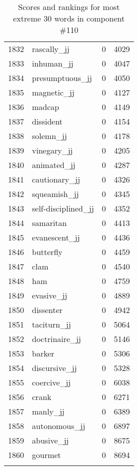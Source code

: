 \begin{longtable}[!htbp]{| rlr@{.}l |}
    1832 & rascally\_jj & 0 & 4029 \\
    1833 & inhuman\_jj & 0 & 4047 \\
    1834 & presumptuous\_jj & 0 & 4050 \\
    1835 & magnetic\_jj & 0 & 4127 \\
    1836 & madcap & 0 & 4149 \\
    1837 & dissident & 0 & 4154 \\
    1838 & solemn\_jj & 0 & 4178 \\
    1839 & vinegary\_jj & 0 & 4205 \\
    1840 & animated\_jj & 0 & 4287 \\
    1841 & cautionary\_jj & 0 & 4326 \\
    1842 & squeamish\_jj & 0 & 4345 \\
    1843 & self-disciplined\_jj & 0 & 4352 \\
    1844 & samaritan & 0 & 4413 \\
    1845 & evanescent\_jj & 0 & 4436 \\
    1846 & butterfly & 0 & 4459 \\
    1847 & clam & 0 & 4540 \\
    1848 & ham & 0 & 4759 \\
    1849 & evasive\_jj & 0 & 4889 \\
    1850 & dissenter & 0 & 4942 \\
    1851 & taciturn\_jj & 0 & 5064 \\
    1852 & doctrinaire\_jj & 0 & 5146 \\
    1853 & barker & 0 & 5306 \\
    1854 & discursive\_jj & 0 & 5328 \\
    1855 & coercive\_jj & 0 & 6038 \\
    1856 & crank & 0 & 6271 \\
    1857 & manly\_jj & 0 & 6389 \\
    1858 & autonomous\_jj & 0 & 6897 \\
    1859 & abusive\_jj & 0 & 8675 \\
    1860 & gourmet & 0 & 8694 \\
    \hline
    \caption{Scores and rankings for most extreme 30 words in component \#110} \\
\end{longtable}
